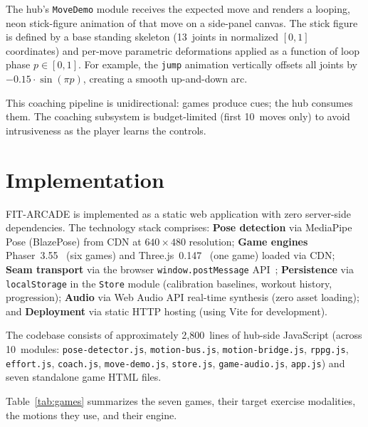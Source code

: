 \documentclass[runningheads]{llncs}
\newcommand{\sys}{\textsc{FIT-ARCADE}}
\begin{document}
The hub's \texttt{MoveDemo} module receives the expected move and renders
a looping, neon stick-figure animation of that move on a side-panel canvas.
The stick figure is defined by a base standing skeleton (13~joints in
normalized $[0,1]$ coordinates) and per-move parametric deformations
applied as a function of loop phase $p \in [0,1]$. For example, the
\texttt{jump} animation vertically offsets all joints by
$-0.15 \cdot \sin(\pi p)$, creating a smooth up-and-down arc.

This coaching pipeline is unidirectional: games produce cues; the hub
consumes them. The coaching subsystem is budget-limited (first 10~moves
only) to avoid intrusiveness as the player learns the controls.

\section{Implementation}
\label{sec:impl}

\sys{} is implemented as a static web application with zero server-side
dependencies. The technology stack comprises:
\textbf{Pose detection} via MediaPipe Pose (BlazePose) from CDN at $640 \times 480$ resolution;
\textbf{Game engines} Phaser~3.55~\cite{phaser2023} (six games) and Three.js~0.147~\cite{threejs2023} (one game) loaded via CDN;
\textbf{Seam transport} via the browser \texttt{window.postMessage} API~\cite{html5postmessage};
\textbf{Persistence} via \texttt{localStorage} in the \texttt{Store} module (calibration baselines, workout history, progression);
\textbf{Audio} via Web Audio API real-time synthesis (zero asset loading); and
\textbf{Deployment} via static HTTP hosting (using Vite for development).

The codebase consists of approximately 2,800~lines of hub-side JavaScript
(across 10~modules: \texttt{pose-detector.js}, \texttt{motion-bus.js},
\texttt{motion-bridge.js}, \texttt{rppg.js}, \texttt{effort.js},
\texttt{coach.js}, \texttt{move-demo.js}, \texttt{store.js},
\texttt{game-audio.js}, \texttt{app.js}) and seven standalone game HTML files.

Table~\ref{tab:games} summarizes the seven games, their target exercise
modalities, the motions they use, and their engine.
\end{document}
